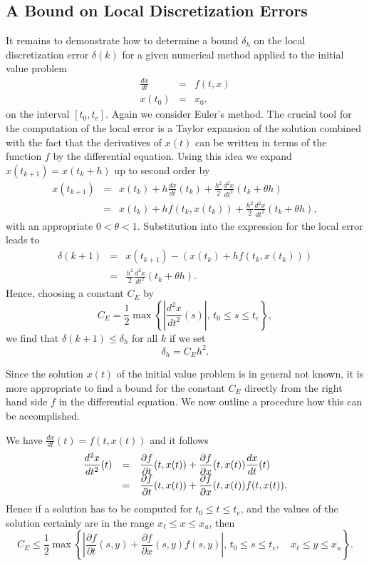 \documentclass{ximera}
\begin{document}
\subsection*{A Bound on Local Discretization Errors}

It remains to demonstrate how to determine a bound $\delta_h$ on
the local discretization error $\delta(k)$ for a given numerical 
method applied to the initial value problem
\begin{eqnarray*}
\frac{dx}{dt} & = & f(t,x)\\
x(t_0) & = & x_0,
\end{eqnarray*}
on the interval $[t_0,t_e]$.  Again we consider Euler's method.
The crucial tool for the computation of the local error is a Taylor
expansion of the solution combined with the fact that the 
derivatives of $x(t)$ can be written in terms of the function $f$
by the differential equation.  Using this idea we 
expand $x(t_{k+1})=x(t_k+h)$ up to second order by
\begin{eqnarray*}
x(t_{k+1})&=&
x(t_k)+h\frac{dx}{dt}(t_k)+\frac{h^2}{2}\frac{d^2x}{dt^2}(t_k+\theta h)\\
&=& x(t_k)+hf(t_k,x(t_k))+\frac{h^2}{2}\frac{d^2x}{dt^2}(t_k+\theta h),
\end{eqnarray*}
with an appropriate $0<\theta<1$.  Substitution into the expression
for the local error leads to
\begin{eqnarray*}
\delta(k+1)&=&x(t_{k+1}) - (x(t_k) + hf(t_k,x(t_k)))\\
&=& \frac{h^2}{2}\frac{d^2x}{dt^2}(t_k+\theta h).
\end{eqnarray*}
Hence, choosing a constant $C_E$ by
\[
C_E=\frac{1}{2}
\max\left\{ \left\vert\frac{d^2x}{dt^2}(s)\right\vert,\, t_0\le s\le t_e\right\},
\]
we find that $\delta(k+1)\le \delta_h$ for all $k$ if we set
\[
\delta_h = C_E h^2.
\]

Since the solution $x(t)$ of the initial value problem is in general
not known, it is more appropriate to find a bound for the
constant $C_E$ directly from the right hand side
$f$ in the differential equation.  We now outline a procedure
how this can be accomplished.

We have $\frac{dx}{dt}(t)=f(t,x(t))$ and it follows
\arraystart
\begin{equation}
\label{eq:Taylor2}
\begin{array}{rcl}
\displaystyle\frac{d^2x}{dt^2}(t) &=& \displaystyle\frac{\partial f}{\partial t}(t,x(t))
+\frac{\partial f}{\partial x}(t,x(t))\frac{dx}{dt}(t)\\
&=& \displaystyle\frac{\partial f}{\partial t}(t,x(t))
+\frac{\partial f}{\partial x}(t,x(t))f(t,x(t)).
\end{array}
\end{equation}
\arrayfinish
Hence if a solution has to be computed for $t_0\le t\le t_e$, and the
values of the solution certainly are in the range $x_\ell \le x \le x_u$, then
\begin{equation} \label{eq:CE}
C_E\le \frac{1}{2}\max\left\{ \left\vert\frac{\partial f}{\partial t}(s,y)
+\frac{\partial f}{\partial x}(s,y)f(s,y)\right\vert,\, t_0\le s\le t_e,\quad
x_\ell \le y \le x_u \right\}.
\end{equation}
\end{document}
